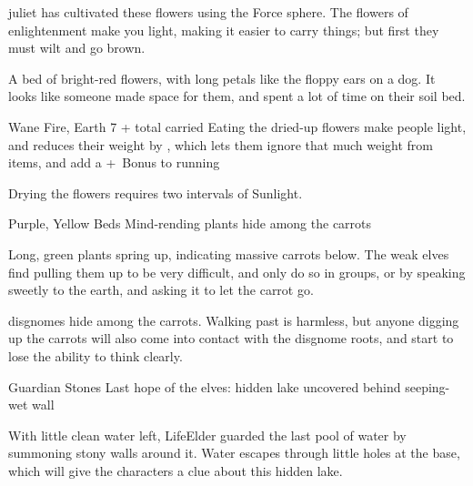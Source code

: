 \begin{multicols}{2}

\Gls{juliet} has cultivated these flowers using the Force \gls{sphere}.
The flowers of enlightenment make you light, making it easier to carry things; but first they must wilt and go brown.

\begin{boxtext}
  A bed of bright-red flowers, with long petals like the floppy ears on a dog.
  It looks like someone made space for them, and spent a lot of time on their soil bed.
\end{boxtext}

\label{flowerOfEnlightenment}
  {}%
  {Wane}%
  {Fire, Earth}%
  {7 + total  carried}%
  {Eating the dried-up flowers make people light, and reduces their \gls{weight} by , which lets them ignore that much \gls{weight} from items, and add a +~Bonus to \gls{running}}%
  {\par%
    Drying the flowers requires two \glspl{interval} of Sunlight.
  }%

\showTalisman

{Purple, Yellow Beds}%
{Mind-rending plants hide among the carrots}%

Long, green plants spring up, indicating massive carrots below.
The weak elves find pulling them up to be very difficult, and only do so in groups, or by speaking sweetly to the earth, and asking it to let the carrot go.

\Glspl{disgnome} hide among the carrots.
Walking past is harmless, but anyone digging up the carrots will also come into contact with the \gls{disgnome} roots, and start to lose the ability to think clearly.

{Guardian Stones}%
{Last hope of the elves: hidden lake uncovered behind seeping-wet wall}%
\label{shadeDamn}


With little clean water left, \gls{LifeElder} guarded the last pool of water by summoning stony walls around it.
Water escapes through little holes at the base, which will give the characters a clue about this hidden lake.


\end{multicols}
